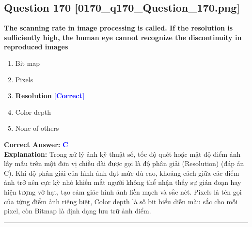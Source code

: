 \documentclass[11pt,a4paper]{article}
\begin{document}
\begin{minipage}{\textwidth}
\subsection*{Question 170 \quad \footnotesize{[0170\_q170\_Question\_170.png]}}
\noindent \textbf{The scanning rate in image processing is called. If the resolution is sufficiently high, the human eye cannot recognize the discontinuity in reproduced images}

\begin{enumerate}[label=\Alph*.]
    \item Bit map
    \item Pixels
    \item \textbf{Resolution} \hfill \textcolor{blue}{\textbf{[Correct]}}
    \item Color depth
    \item None of others
\end{enumerate}

\noindent \textbf{Correct Answer:} \textcolor{blue}{\textbf{C}} \\[2pt]
\noindent \textbf{Explanation:} Trong xử lý ảnh kỹ thuật số, tốc độ quét hoặc mật độ điểm ảnh lấy mẫu trên một đơn vị chiều dài được gọi là độ phân giải (Resolution) (đáp án C). Khi độ phân giải của hình ảnh đạt mức đủ cao, khoảng cách giữa các điểm ảnh trở nên cực kỳ nhỏ khiến mắt người không thể nhận thấy sự gián đoạn hay hiện tượng vỡ hạt, tạo cảm giác hình ảnh liền mạch và sắc nét. Pixels là tên gọi của từng điểm ảnh riêng biệt, Color depth là số bit biểu diễn màu sắc cho mỗi pixel, còn Bitmap là định dạng lưu trữ ảnh điểm.

\par\vspace{0.3cm}
\hrule
\vspace{0.3cm}
\end{minipage}
\end{document}
